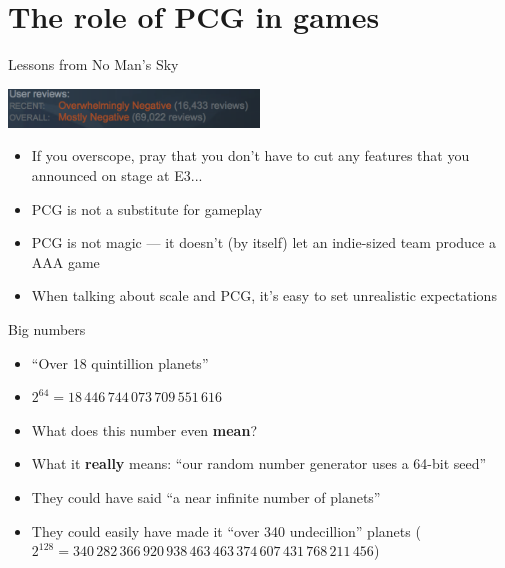 \part{The role of PCG in games}
\frame{\partpage}

\begin{frame}{Lessons from No Man's Sky}
	\begin{center}
		\pause\includegraphics[width=0.5\textwidth]{nomanssky_steamreviews}
	\end{center}
	\begin{itemize}
		\pause\item If you overscope, pray that you don't have to cut any features
			that you announced on stage at E3...
		\pause\item PCG is not a substitute for gameplay
		\pause\item PCG is not magic --- it doesn't (by itself) let an indie-sized team produce a AAA game
		\pause\item When talking about scale and PCG, it's easy to set unrealistic expectations
	\end{itemize}	
\end{frame}

\begin{frame}{Big numbers}
	\begin{itemize}
		\pause\item ``Over 18 quintillion planets''
		\pause\item $2^{64} = 18\,446\,744\,073\,709\,551\,616$
		\pause\item What does this number even \textbf{mean}?
		\pause\item What it \textbf{really} means: ``our random number generator uses a 64-bit seed''
		\pause\item They could have said ``a near infinite number of planets''
		\pause\item They could easily have made it ``over 340 undecillion'' planets
			($2^{128} = 340\,282\,366\,920\,938\,463\,463\,374\,607\,431\,768\,211\,456$)
	\end{itemize}
\end{frame}

